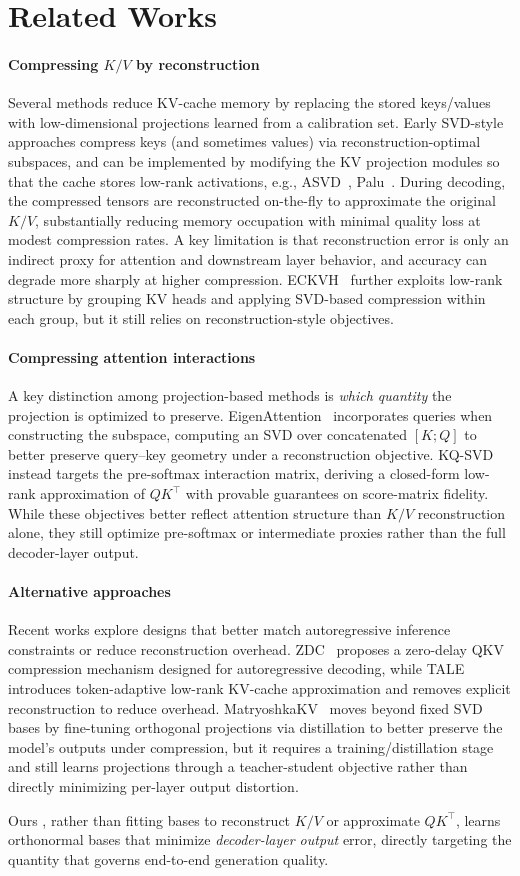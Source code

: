 \section{Related Works}
\label{sec:related}

\paragraph{Compressing $K/V$ by reconstruction}
Several methods reduce KV-cache memory by replacing the stored keys/values with low-dimensional projections learned from a calibration set.
Early SVD-style approaches compress keys (and sometimes values) via reconstruction-optimal subspaces, and can be implemented by modifying the KV projection modules so that the cache stores low-rank activations, e.g., ASVD~\citep{asvd}, Palu~\citep{chang2025palu}.
During decoding, the compressed tensors are reconstructed on-the-fly to approximate the original $K/V$, substantially reducing memory occupation with minimal quality loss at modest compression rates.
A key limitation is that reconstruction error is only an indirect proxy for attention and downstream layer behavior, and accuracy can degrade more sharply at higher compression.
ECKVH~\citep{yu2024eckvh} further exploits low-rank structure by grouping KV heads and applying SVD-based compression within each group, but it still relies on reconstruction-style objectives.

\paragraph{Compressing attention interactions}
A key distinction among projection-based methods is \emph{which quantity} the projection is optimized to preserve.
EigenAttention~\citep{saxena2024eigenattention} incorporates queries when constructing the subspace, computing an SVD over concatenated $[K;Q]$ to better preserve query--key geometry under a reconstruction objective.
KQ-SVD~\citep{lesens2025kqsvd} instead targets the pre-softmax interaction matrix, deriving a closed-form low-rank approximation of $QK^\top$ with provable guarantees on score-matrix fidelity.
While these objectives better reflect attention structure than $K/V$ reconstruction alone, they still optimize pre-softmax or intermediate proxies rather than the full decoder-layer output.

\paragraph{Alternative approaches}
Recent works explore designs that better match autoregressive inference constraints or reduce reconstruction overhead.
ZDC~\citep{zhang2024zdc} proposes a zero-delay QKV compression mechanism designed for autoregressive decoding, while TALE~\citep{TALE} introduces token-adaptive low-rank KV-cache approximation and removes explicit reconstruction to reduce overhead.
MatryoshkaKV~\citep{lin2025matryoshkakv} moves beyond fixed SVD bases by fine-tuning orthogonal projections via distillation to better preserve the model's outputs under compression, but it requires a training/distillation stage and still learns projections through a teacher-student objective rather than directly minimizing per-layer output distortion.

Ours \methodname, rather than fitting bases to reconstruct $K/V$ or approximate $QK^\top$, learns orthonormal bases that minimize \emph{decoder-layer output} error, directly targeting the quantity that governs end-to-end generation quality.